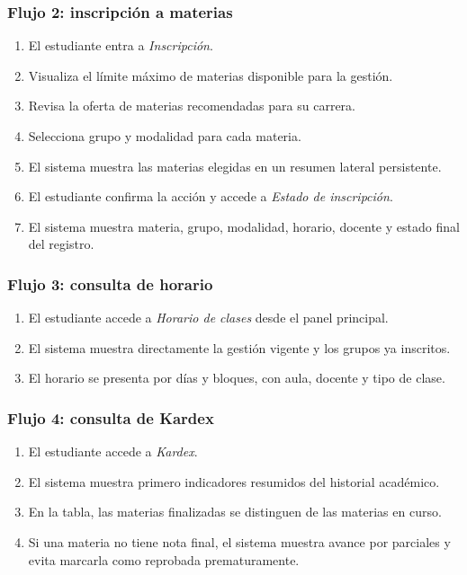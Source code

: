 \subsubsection*{Flujo 2: inscripción a materias}

\begin{enumerate}
  \item El estudiante entra a \textit{Inscripción}.
  \item Visualiza el límite máximo de materias disponible para la gestión.
  \item Revisa la oferta de materias recomendadas para su carrera.
  \item Selecciona grupo y modalidad para cada materia.
  \item El sistema muestra las materias elegidas en un resumen lateral persistente.
  \item El estudiante confirma la acción y accede a \textit{Estado de inscripción}.
  \item El sistema muestra materia, grupo, modalidad, horario, docente y estado final del registro.
\end{enumerate}

\subsubsection*{Flujo 3: consulta de horario}

\begin{enumerate}
  \item El estudiante accede a \textit{Horario de clases} desde el panel principal.
  \item El sistema muestra directamente la gestión vigente y los grupos ya inscritos.
  \item El horario se presenta por días y bloques, con aula, docente y tipo de clase.
\end{enumerate}

\subsubsection*{Flujo 4: consulta de Kardex}

\begin{enumerate}
  \item El estudiante accede a \textit{Kardex}.
  \item El sistema muestra primero indicadores resumidos del historial académico.
  \item En la tabla, las materias finalizadas se distinguen de las materias en curso.
  \item Si una materia no tiene nota final, el sistema muestra avance por parciales y evita marcarla como reprobada prematuramente.
\end{enumerate}

